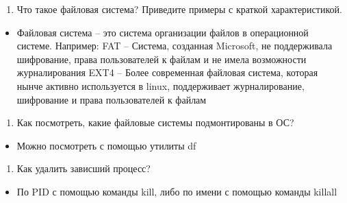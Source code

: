 \begin{enumerate}
\def\labelenumi{\arabic{enumi})}
\setcounter{enumi}{2}
\tightlist
\item
  Что такое файловая система? Приведите примеры с краткой
  характеристикой.
\end{enumerate}

\begin{itemize}
\tightlist
\item
  Файловая система -- это система организации файлов в операционной
  системе. Например: FAT -- Система, созданная Microsoft, не
  поддерживала шифрование, права пользователей к файлам и не имела
  возможности журналирования EXT4 -- Более современная файловая система,
  которая нынче активно используется в linux, поддерживает
  журналирование, шифрование и права пользователей к файлам
\end{itemize}

\begin{enumerate}
\def\labelenumi{\arabic{enumi})}
\setcounter{enumi}{3}
\tightlist
\item
  Как посмотреть, какие файловые системы подмонтированы в ОС?
\end{enumerate}

\begin{itemize}
\tightlist
\item
  Можно посмотреть с помощью утилиты df
\end{itemize}

\begin{enumerate}
\def\labelenumi{\arabic{enumi})}
\setcounter{enumi}{4}
\tightlist
\item
  Как удалить зависший процесс?
\end{enumerate}

\begin{itemize}
\tightlist
\item
  По PID с помощью команды kill, либо по имени с помощью команды killall
\end{itemize}
